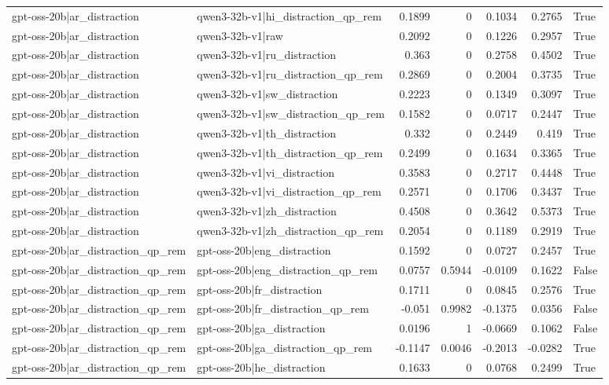 \begin{table}
\begin{tabular}{l l r r r r l}
gpt-oss-20b|ar_distraction & qwen3-32b-v1|hi_distraction_qp_rem & 0.1899 & 0 & 0.1034 & 0.2765 & True \\
gpt-oss-20b|ar_distraction & qwen3-32b-v1|raw & 0.2092 & 0 & 0.1226 & 0.2957 & True \\
gpt-oss-20b|ar_distraction & qwen3-32b-v1|ru_distraction & 0.363 & 0 & 0.2758 & 0.4502 & True \\
gpt-oss-20b|ar_distraction & qwen3-32b-v1|ru_distraction_qp_rem & 0.2869 & 0 & 0.2004 & 0.3735 & True \\
gpt-oss-20b|ar_distraction & qwen3-32b-v1|sw_distraction & 0.2223 & 0 & 0.1349 & 0.3097 & True \\
gpt-oss-20b|ar_distraction & qwen3-32b-v1|sw_distraction_qp_rem & 0.1582 & 0 & 0.0717 & 0.2447 & True \\
gpt-oss-20b|ar_distraction & qwen3-32b-v1|th_distraction & 0.332 & 0 & 0.2449 & 0.419 & True \\
gpt-oss-20b|ar_distraction & qwen3-32b-v1|th_distraction_qp_rem & 0.2499 & 0 & 0.1634 & 0.3365 & True \\
gpt-oss-20b|ar_distraction & qwen3-32b-v1|vi_distraction & 0.3583 & 0 & 0.2717 & 0.4448 & True \\
gpt-oss-20b|ar_distraction & qwen3-32b-v1|vi_distraction_qp_rem & 0.2571 & 0 & 0.1706 & 0.3437 & True \\
gpt-oss-20b|ar_distraction & qwen3-32b-v1|zh_distraction & 0.4508 & 0 & 0.3642 & 0.5373 & True \\
gpt-oss-20b|ar_distraction & qwen3-32b-v1|zh_distraction_qp_rem & 0.2054 & 0 & 0.1189 & 0.2919 & True \\
gpt-oss-20b|ar_distraction_qp_rem & gpt-oss-20b|eng_distraction & 0.1592 & 0 & 0.0727 & 0.2457 & True \\
gpt-oss-20b|ar_distraction_qp_rem & gpt-oss-20b|eng_distraction_qp_rem & 0.0757 & 0.5944 & -0.0109 & 0.1622 & False \\
gpt-oss-20b|ar_distraction_qp_rem & gpt-oss-20b|fr_distraction & 0.1711 & 0 & 0.0845 & 0.2576 & True \\
gpt-oss-20b|ar_distraction_qp_rem & gpt-oss-20b|fr_distraction_qp_rem & -0.051 & 0.9982 & -0.1375 & 0.0356 & False \\
gpt-oss-20b|ar_distraction_qp_rem & gpt-oss-20b|ga_distraction & 0.0196 & 1 & -0.0669 & 0.1062 & False \\
gpt-oss-20b|ar_distraction_qp_rem & gpt-oss-20b|ga_distraction_qp_rem & -0.1147 & 0.0046 & -0.2013 & -0.0282 & True \\
gpt-oss-20b|ar_distraction_qp_rem & gpt-oss-20b|he_distraction & 0.1633 & 0 & 0.0768 & 0.2499 & True \\

\end{tabular}
\end{table}
